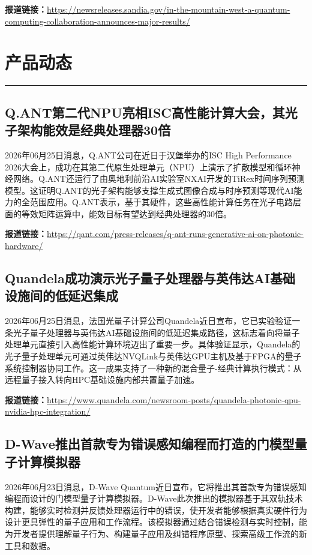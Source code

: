 \documentclass[12pt,a4paper]{ctexart}
\begin{document}
\noindent\textbf{报道链接：}\url{https://newsreleases.sandia.gov/in-the-mountain-west-a-quantum-computing-collaboration-announces-major-results/}


\newpage
\section{产品动态}
\vspace{-0.5em}
\noindent\rule{\linewidth}{1.5pt}

\subsection{ Q.ANT第二代NPU亮相ISC高性能计算大会，其光子架构能效是经典处理器30倍 }

2026年06月25日消息，Q.ANT公司在近日于汉堡举办的ISC High Performance 2026大会上，成功在其第二代原生处理单元（NPU）上演示了扩散模型和循环神经网络。Q.ANT还运行了由奥地利前沿AI实验室NXAI开发的TiRex时间序列预测模型。这证明Q.ANT的光子架构能够支撑生成式图像合成与时序预测等现代AI能力的全范围应用。Q.ANT表示，基于其硬件，这些高性能计算任务在光子电路层面的等效矩阵运算中，能效目标有望达到经典处理器的30倍。

\noindent\textbf{报道链接：}\url{https://qant.com/press-releases/q-ant-runs-generative-ai-on-photonic-hardware/}

\subsection{ Quandela成功演示光子量子处理器与英伟达AI基础设施间的低延迟集成 }

2026年06月25日消息，法国光量子计算公司Quandela近日宣布，它已实验验证一条光子量子处理器与英伟达AI基础设施间的低延迟集成路径，这标志着向将量子处理单元直接引入高性能计算环境迈出了重要一步。具体验证显示，Quandela的光子量子处理单元可通过英伟达NVQLink与英伟达GPU主机及基于FPGA的量子系统控制器协同工作。这一成果支持了一种新的混合量子-经典计算执行模式：从远程量子接入转向HPC基础设施内部共置量子加速。

\noindent\textbf{报道链接：}\url{https://www.quandela.com/newsroom-posts/quandela-photonic-qpu-nvidia-hpc-integration/}

\subsection{ D-Wave推出首款专为错误感知编程而打造的门模型量子计算模拟器 }

2026年06月23日消息，D-Wave Quantum近日宣布，它将推出其首款专为错误感知编程而设计的门模型量子计算模拟器。D-Wave此次推出的模拟器基于其双轨技术构建，能够实时检测并反馈处理器运行中的错误，使开发者能够根据真实硬件行为设计更具弹性的量子应用和工作流程。该模拟器通过结合错误检测与实时控制，能为开发者提供理解量子行为、构建量子应用及纠错程序原型、探索高级工作流的新工具和数据。
\end{document}
